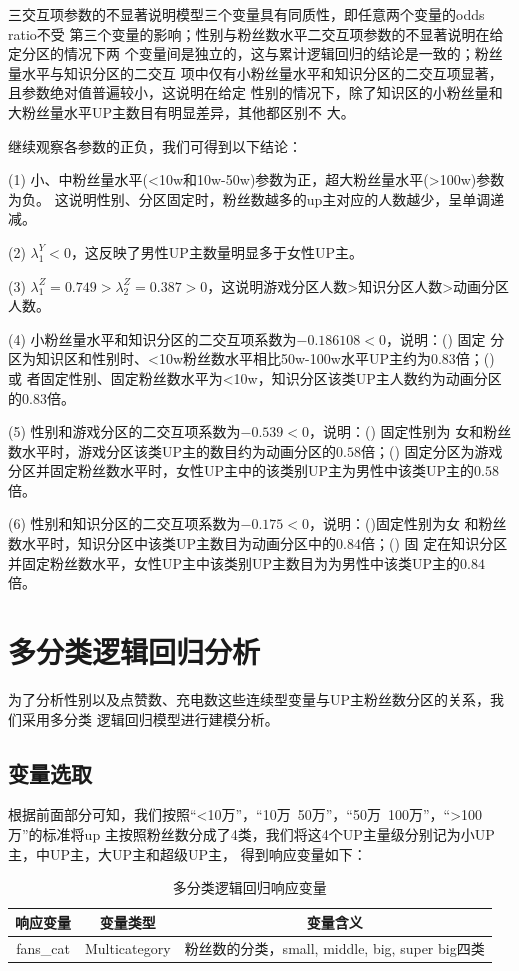 \documentclass{ctexart}
\begin{document}
三交互项参数的不显著说明模型三个变量具有同质性，即任意两个变量的odds ratio不受
第三个变量的影响；性别与粉丝数水平二交互项参数的不显著说明在给定分区的情况下两
个变量间是独立的，这与累计逻辑回归的结论是一致的；粉丝量水平与知识分区的二交互
项中仅有小粉丝量水平和知识分区的二交互项显著，且参数绝对值普遍较小，这说明在给定
性别的情况下，除了知识区的小粉丝量和大粉丝量水平UP主数目有明显差异，其他都区别不
大。

继续观察各参数的正负，我们可得到以下结论：

(1) 小、中粉丝量水平(<10w和10w-50w)参数为正，超大粉丝量水平(>100w)参数为负。
这说明性别、分区固定时，粉丝数越多的up主对应的人数越少，呈单调递减。

(2) $\lambda_1^Y<0$，这反映了男性UP主数量明显多于女性UP主。

(3) $\lambda_1^Z=0.749>\lambda_2^Z=0.387>0$，这说明游戏分区人数>知识分区人数>动画分区人数。

(4) 小粉丝量水平和知识分区的二交互项系数为$-0.186108<0$，说明：() 固定
分区为知识区和性别时、<10w粉丝数水平相比50w-100w水平UP主约为$0.83$倍；() 或
者固定性别、固定粉丝数水平为<10w，知识分区该类UP主人数约为动画分区的0.83倍。

(5) 性别和游戏分区的二交互项系数为$-0.539<0$，说明：() 固定性别为
女和粉丝数水平时，游戏分区该类UP主的数目约为动画分区的$0.58$倍；() 
固定分区为游戏分区并固定粉丝数水平时，女性UP主中的该类别UP主为男性中该类UP主的$0.58$倍。

(6) 性别和知识分区的二交互项系数为$-0.175<0$，说明：()固定性别为女
和粉丝数水平时，知识分区中该类UP主数目为动画分区中的$0.84$倍；() 固
定在知识分区并固定粉丝数水平，女性UP主中该类别UP主数目为为男性中该类UP主的$0.84$倍。


\section{多分类逻辑回归分析}

为了分析性别以及点赞数、充电数这些连续型变量与UP主粉丝数分区的关系，我们采用多分类
逻辑回归模型进行建模分析。

\subsection{变量选取}

根据前面部分可知，我们按照“<10万”，“10万~50万”，“50万~100万”，“>100万”的标准将up
主按照粉丝数分成了4类，我们将这4个UP主量级分别记为小UP主，中UP主，大UP主和超级UP主，
得到响应变量如下：
\begin{table}[H]
    \centering
    \begin{tabular}{ccc}
        \toprule
         响应变量 & 变量类型 & 变量含义  \\
        \midrule
         fans\_cat & Multicategory & 粉丝数的分类，small, middle, big, super big四类 \\
        \bottomrule
    \end{tabular}
    \caption{多分类逻辑回归响应变量}
\end{table}
\end{document}
